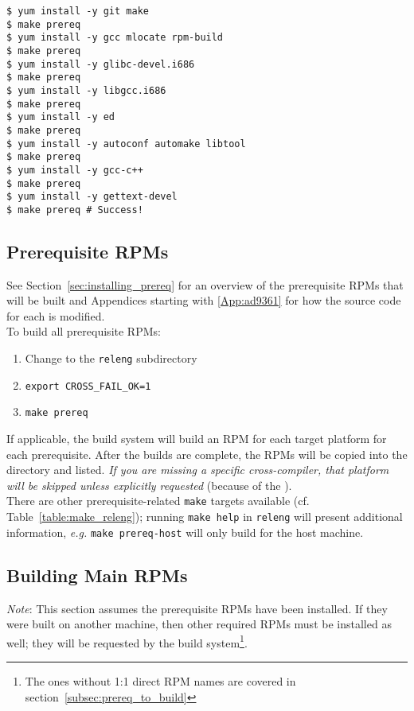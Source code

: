 \begin{appendices}
\begin{lstlisting}[basicstyle=\ttfamily]
$ yum install -y git make
$ make prereq
$ yum install -y gcc mlocate rpm-build
$ make prereq
$ yum install -y glibc-devel.i686
$ make prereq
$ yum install -y libgcc.i686
$ make prereq
$ yum install -y ed
$ make prereq
$ yum install -y autoconf automake libtool
$ make prereq
$ yum install -y gcc-c++
$ make prereq
$ yum install -y gettext-devel
$ make prereq # Success!
\end{lstlisting}

\subsection{Prerequisite RPMs}
\label{App:building_rpms:prereq}
See Section~\ref{sec:installing_prereq} for an overview of the prerequisite RPMs that will be built and Appendices starting with \ref{App:ad9361} for how the source code for each is modified.\\

To build all prerequisite RPMs:
\begin{enumerate}
\item Change to the \texttt{releng} subdirectory
\item \texttt{export CROSS\_FAIL\_OK=1}
\item \texttt{make prereq}
\end{enumerate}

If applicable, the build system will build an RPM for each target platform for each prerequisite. After the builds are complete, the RPMs will be copied into the  directory and listed. \textit{If you are missing a specific cross-compiler, that platform will be skipped unless explicitly requested} (because of the ).\\

There are other prerequisite-related \texttt{make} targets available (cf. Table~\ref{table:make_releng}); running \texttt{make help} in \texttt{releng} will present additional information, \textit{e.g.} \texttt{make prereq-host} will only build for the host machine.

\subsection{Building Main RPMs}
\textit{Note}: This section assumes the prerequisite RPMs have been installed. If they were built on another machine, then other required RPMs must be installed as well; they will be requested by the build system\footnote{The ones without 1:1 direct RPM names are covered in section~\ref{subsec:prereq_to_build}}.\\


\end{appendices}
